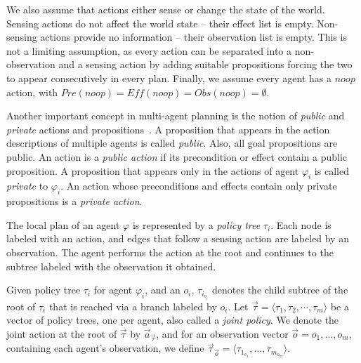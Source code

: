 \documentclass[letterpaper]{article}
\theoremstyle{definition}
\begin{document}
We also assume that actions either sense or change the state of the world. Sensing actions do not affect the world state --  their effect list is empty.  Non-sensing actions provide
no information -- their observation list is empty. This is not a limiting assumption, as every action can be separated into a non-observation and a sensing action by adding suitable propositions forcing the two to appear consecutively in every plan. Finally, we assume every agent has a $noop$ action, with $\mathit{Pre}(noop)=\mathit{Eff}(noop) =\mathit{Obs}(noop)= \emptyset$.


Another important concept in multi-agent planning is the notion of {\em public} and {\em private} actions and propositions~\citep{brafman2008one}.
A proposition that appears in the action descriptions of multiple agents is called {\em public}. Also, all goal propositions are public.
An action is a {\em public action} if its precondition or effect contain a public proposition.
A proposition that appears only in the actions of agent $\varphi_i$ is called {\em private} to  $\varphi_i$. An action whose preconditions and effects contain only private propositions is a {\em private action}.




The local plan of an agent $\varphi$ is represented by a \emph{policy tree} $\tau_i$.  Each node is labeled with an action, and edges that follow a sensing action are labeled by an observation.  The agent performs the action at the root and continues to the subtree labeled with the observation it obtained.

Given policy tree $\tau_i$ for agent $\varphi_i$, and an $o_i$, $\tau_{i_{o_i}}$ denotes the child subtree of the root of $\tau_i$ that is reached via a branch labeled by $o_i$.
Let $\vec{\tau} = \langle  \tau_1, \tau_2, \cdots, \tau_m \rangle$ be a vector of policy trees, one per agent,
also called a {\em joint policy}.
We denote the joint action at the root of $\vec{\tau}$ by $\vec{a}_{\vec{\tau}}$, and for an observation vector
$\vec{o}=o_1,\ldots, o_m$, containing each agent's observation, we define $\vec{\tau}_{\vec{o}}= \langle  \tau_{1_{o_1}},\ldots, \tau_{m_{o_m}}\rangle$.
\end{document}
